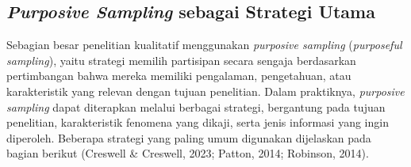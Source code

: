 \documentclass[
  indonesian,
  letterpaper,
  DIV=11,
  numbers=noendperiod]{scrreprt}
\begin{document}
\subsection{\texorpdfstring{\emph{Purposive Sampling} sebagai Strategi
Utama}{Purposive Sampling sebagai Strategi Utama}}\label{purposive-sampling-sebagai-strategi-utama}

Sebagian besar penelitian kualitatif menggunakan \emph{purposive
sampling} (\emph{purposeful sampling}), yaitu strategi memilih
partisipan secara sengaja berdasarkan pertimbangan bahwa mereka memiliki
pengalaman, pengetahuan, atau karakteristik yang relevan dengan tujuan
penelitian. Dalam praktiknya, \emph{purposive sampling} dapat diterapkan
melalui berbagai strategi, bergantung pada tujuan penelitian,
karakteristik fenomena yang dikaji, serta jenis informasi yang ingin
diperoleh. Beberapa strategi yang paling umum digunakan dijelaskan pada
bagian berikut (Creswell \& Creswell, 2023; Patton, 2014; Robinson,
2014).
\end{document}
